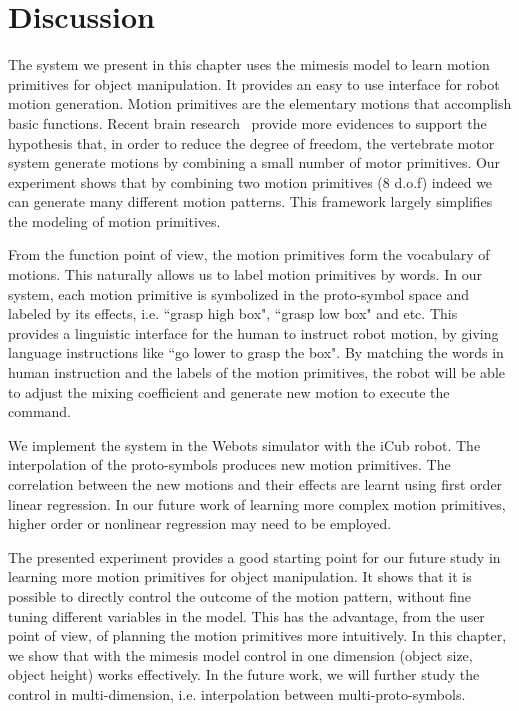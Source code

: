 \section{Discussion}
\label{cha5:sec4:discussion}

The system we present in this chapter uses the mimesis model to learn motion primitives for object manipulation. It provides an easy to use interface for robot motion generation. Motion primitives are the elementary motions that accomplish basic functions. Recent brain research~\cite{bizzi2008combining} provide more evidences to support the hypothesis that, in order to reduce the degree of freedom, the vertebrate motor system generate motions by combining a small number of motor primitives. Our experiment shows that by combining two motion primitives (8 d.o.f) indeed we can generate many different motion patterns. This framework largely simplifies the modeling of motion primitives.

From the function point of view, the motion primitives form the vocabulary of motions. This naturally allows us to label motion primitives by words. In our system, each motion primitive is symbolized in the proto-symbol space and labeled by its effects, i.e. ``grasp high box", ``grasp low box" and etc. This provides a linguistic interface for the human to instruct robot motion, by giving language instructions like ``go lower to grasp the box". By matching the words in human instruction and the labels of the motion primitives, the robot will be able to adjust the mixing coefficient and generate new motion to execute the command.

We implement the system in the Webots simulator with the iCub robot. The interpolation of the proto-symbols produces new motion primitives. The correlation between the new motions and their effects are learnt using first order linear regression. In our future work of learning more complex motion primitives, higher order or nonlinear regression may need to be employed.

The presented experiment provides a good starting point for our future study in learning more motion primitives for object manipulation. It shows that it is possible to directly control the outcome of the motion pattern, without fine tuning different variables in the model. This has the advantage, from the user point of view, of planning the motion primitives more intuitively. In this chapter, we show that with the mimesis model control in one dimension (object size, object height) works effectively. In the future work, we will further study the control in multi-dimension, i.e. interpolation between multi-proto-symbols.


